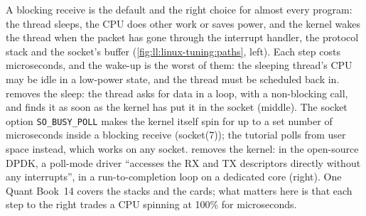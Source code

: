 A blocking receive is the default and the right choice for almost every program: the thread sleeps, the CPU does other work
or saves power, and the kernel wakes the thread when the packet has gone through the interrupt handler, the protocol stack and
the socket's buffer (\cref{fig:ll:linux-tuning:paths}, left). Each step costs microseconds, and the wake-up is the worst of
them: the sleeping thread's CPU may be idle in a low-power state, and the thread must be scheduled back in. 
removes the sleep: the thread asks for data in a loop, with a non-blocking call, and finds it as soon as the kernel has put it
in the socket (middle). The socket option \texttt{SO\_BUSY\_POLL} makes the kernel itself spin for up to a set number of
microseconds inside a blocking receive (socket(7)); the tutorial polls from user space instead, which works on any socket.
 removes the kernel: in the open-source DPDK, a poll-mode driver ``accesses the RX and TX descriptors directly
without any interrupts'', in a run-to-completion loop on a dedicated core (right). One Quant Book~14 covers the stacks and the
cards; what matters here is that each step to the right trades a CPU spinning at 100\% for microseconds.

